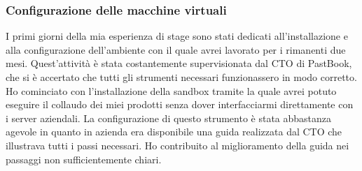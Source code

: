 			\subsubsection{Configurazione delle macchine virtuali}
				I primi giorni della mia esperienza di stage sono stati dedicati all'installazione e alla configurazione
				dell'ambiente con il quale avrei lavorato per i rimanenti due mesi. Quest'attività è stata costantemente
				supervisionata dal CTO di PastBook, che si è accertato che tutti gli strumenti necessari funzionassero in modo
				corretto.\\
				Ho cominciato con l'installazione della sandbox tramite la quale avrei potuto eseguire il collaudo dei miei prodotti
				senza dover interfacciarmi direttamente con i server aziendali. La configurazione di questo strumento è stata
				abbastanza agevole in quanto in azienda era disponibile una guida realizzata dal CTO che illustrava tutti i passi
				necessari. Ho contribuito al miglioramento della guida nei passaggi non sufficientemente chiari.
